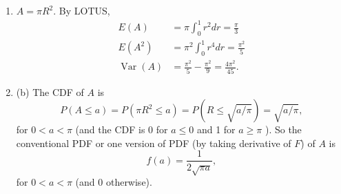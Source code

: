 

\setcounter{theorem}{4}
\begin{exercise}[BH.5.5] 
\begin{solution}
    \begin{enumerate}
        \item $A=\pi R^2$. By LOTUS,
        $$
        \begin{aligned}
            E(A) &=\pi \int_0^1 r^2 d r=\frac{\pi}{3} \\
            E\left(A^2\right) &=\pi^2 \int_0^1 r^4 d r=\frac{\pi^2}{5} \\
            \operatorname{Var}(A) &=\frac{\pi^2}{5}-\frac{\pi^2}{9}=\frac{4 \pi^2}{45} .
        \end{aligned}
        $$
        \item  (b) The CDF of $A$ is
        $$
        P(A \leq a)=P\left(\pi R^2 \leq a\right)=P(R \leq \sqrt{a / \pi})=\sqrt{a / \pi},
        $$
        for $0<a<\pi$ (and the CDF is 0 for $a \leq 0$ and 1 for $a \geq \pi$ ). So the conventional PDF or one version of PDF (by taking derivative of $F$) of $A$ is
        $$
        f(a)=\frac{1}{2 \sqrt{\pi a}},
        $$
        for $0<a<\pi$ (and 0 otherwise).
    \end{enumerate}
\end{solution}
\end{exercise}


